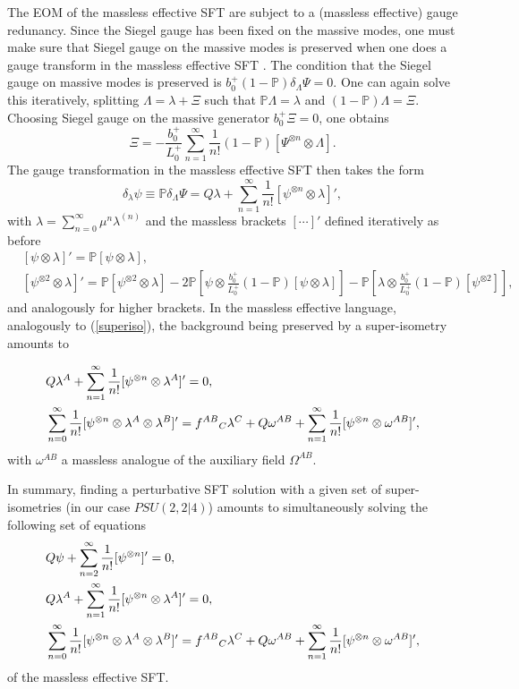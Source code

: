 \documentclass[12pt]{article}
\def\be{\begin{equation}}
\def\ee{\end{equation}}
\numberwithin{equation}{section}
\begin{document}
The EOM of the massless effective SFT are subject to a (massless effective) gauge redunancy. Since the Siegel gauge has been fixed on the massive modes, one must make sure that Siegel gauge on the massive modes is preserved when one does a gauge transform in the massless effective SFT \cite{Mazel:2025fxj}. The condition that the Siegel gauge on massive modes is preserved is $b_0^+ (1-\mathbb{P}) \delta_\Lambda \Psi = 0$. One can again solve this iteratively, splitting $\Lambda = \lambda + \Xi$ such that $\mathbb{P}\Lambda = \lambda$ and $(1-\mathbb{P})\Lambda=\Xi$. Choosing Siegel gauge on the massive generator $b_0^+ \Xi = 0$, one obtains
\be
\Xi = - \frac{b_0^+}{L_0^+} \sum\limits_{n=1}^\infty \frac{1}{n!}(1-\mathbb{P})[\Psi^{\otimes n}\otimes \Lambda].
\ee
The gauge transformation in the massless effective SFT then takes the form
\be
\delta_\lambda \psi \equiv \mathbb{P} \delta_\Lambda \Psi = Q \lambda + \sum\limits_{n=1}^\infty \frac{1}{n!}[\psi^{\otimes n}\otimes \lambda]',
\label{variationMassless}
\ee
with $\lambda = \sum_{n=0}^\infty \mu^n \lambda^{(n)}$ and the massless brackets $[\cdots]'$ defined iteratively as before
\be
\begin{aligned}
    \label{bracket1}
    &[\psi \otimes \lambda]' = \mathbb{P}[\psi \otimes \lambda], \\
    &[\psi^{\otimes 2} \otimes \lambda]' = \mathbb{P}[\psi^{\otimes 2} \otimes \lambda] - 2\mathbb{P} \left[\psi \otimes \frac{b_0^+}{L_0^+}(1-\mathbb{P})[\psi \otimes \lambda]\right] - \mathbb{P}\left[\lambda \otimes \frac{b_0^+}{L_0^+}(1-\mathbb{P})[\psi^{\otimes 2}]\right],
\end{aligned}
\ee
and analogously for higher brackets. In the massless effective language, analogously to (\ref{superiso}), the background being preserved by a super-isometry amounts to \cite{Mazel:2025fxj}

\be
\begin{aligned}
	& Q \lambda^A + \sum_{n=1}^\infty {1\over n!} [\psi^{\otimes n}\otimes \lambda^A]'= 0,
\\
&\sum_{n=0}^\infty {1\over n!}  [\psi^{\otimes n}\otimes \lambda^A\otimes \lambda^B ]' = f^{AB}{}_C \lambda^C + Q \omega^{AB} + \sum_{n=1}^\infty {1\over n!} [\psi^{\otimes n}\otimes \omega^{AB}]',
\end{aligned}
\ee
with $\omega^{AB}$ a massless analogue of the auxiliary field $\Omega^{AB}$.


In summary, finding a perturbative SFT solution with a given set of super-isometries (in our case $PSU(2,2|4)$) amounts to simultaneously solving the following set of equations
\be
\begin{aligned}
& Q \psi + \sum\limits_{n=2}^\infty \frac{1}{n!}[\psi^{\otimes n}]' = 0, \\
& Q \lambda^A + \sum_{n=1}^\infty {1\over n!} [\psi^{\otimes n}\otimes \lambda^A]' = 0,
\\
&\sum_{n=0}^\infty {1\over n!}  [\psi^{\otimes n}\otimes \lambda^A\otimes \lambda^B ]' = f^{AB}{}_C \lambda^C + Q \omega^{AB} + \sum_{n=1}^\infty {1\over n!} [\psi^{\otimes n}\otimes \omega^{AB}]',
\label{extendedProblem}
\end{aligned}
\ee
of the massless effective SFT.
\end{document}
